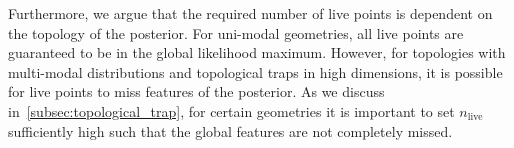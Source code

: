 \documentclass[11pt]{article}
\begin{document}
    Furthermore, we argue that the required number of live points is dependent on the topology of the posterior.
    For uni-modal geometries, all live points are guaranteed to be in the global likelihood maximum.
    However, for topologies with multi-modal distributions and topological traps in high dimensions,
    it is possible for live points to miss features of the posterior.
    As we discuss in~\ref{subsec:topological_trap}, for certain geometries it is important to
    set $n_{\text{live}}$ sufficiently high such that the global features are not completely missed.
\end{document}
